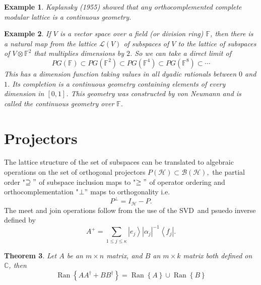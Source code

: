 \documentclass[aps,preprint]{revtex4}%
\newtheorem{theorem}{Theorem}
\newtheorem{example}[theorem]{Example}
\begin{document}
\begin{example}
Kaplansky (1955) showed that \emph{any} orthocomplemented complete modular
lattice is a continuous geometry.
\end{example}

\begin{example}
If $V$ is a vector space over a field (or division ring) $\mathbb{F}$, then
there is a natural map from the lattice $\mathcal{L}(V)$ of subspaces of $V$
to the lattice of subspaces of $V\otimes\mathbb{F}^{2}$ that multiplies
dimensions by $2$. So we can take a direct limit of%
\begin{equation}
PG(\mathbb{F})\subset PG(\mathbb{F}^{2})\subset PG(\mathbb{F}^{4})\subset
PG(\mathbb{F}^{8})\subset\cdots
\end{equation}
This has a dimension function taking values in all dyadic rationals between
$0$ and $1$. Its completion is a continuous geometry containing elements of
every dimension in $[0,1]$. This geometry was constructed by von Neumann and
is called the continuous geometry over $\mathbb{F}.$
\end{example}

\section{Projectors}

The lattice structure of the set of subspaces can be translated to algebraic
operations on the set of orthogonal projectors $P\left(  \mathcal{H}\right)
\subset\mathcal{B}\left(  \mathcal{H}\right)  ,$ the partial order
"$\supseteq"$ of subspace inclusion maps to "$\geq"$ of operator ordering and
orthocomplementation "$\bot"$ maps to orthogonality i.e.
\begin{equation}
P^{\bot}=I_{\mathcal{H}}-P.
\end{equation}
The meet and join operations follow from the use of the SVD\ and psuedo
inverse defined by
\begin{equation}
A^{+}=\sum_{1\leq j\leq\kappa}\left\vert e_{j}\right\rangle \left\vert
\alpha_{j}\right\vert ^{-1}\left\langle f_{j}\right\vert .
\end{equation}


\begin{theorem}
Let $A$ be an $m\times n$ matrix, and $B$ an $m\times k$ matrix both defined
on $\mathbb{C}$, then%
\begin{equation}
\operatorname{Ran}\left\{  AA^{\dagger}+BB^{\dagger}\right\}
=\operatorname{Ran}\left\{  A\right\}  \cup\operatorname{Ran}\left\{
B\right\}
\end{equation}

\end{theorem}
\end{document}

